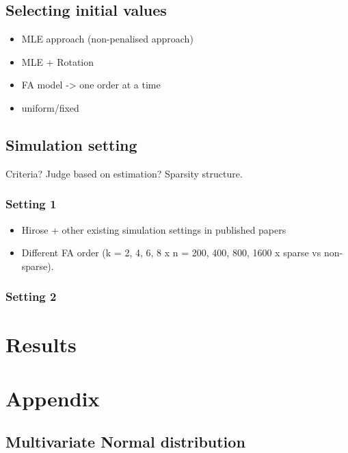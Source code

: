 \documentclass[
  a4paper,
  oneside,
  openany,
  12pt,
  onecolumn,
  twoside]{book}
\providecommand{\tightlist}{%
  \setlength{\itemsep}{0pt}\setlength{\parskip}{0pt}}\usepackage{longtable,booktabs,array}
\theoremstyle{plain}
\theoremstyle{remark}
\begin{document}
\section{Selecting initial values}\label{selecting-initial-values}

\begin{itemize}
\tightlist
\item
  MLE approach (non-penalised approach)
\item
  MLE + Rotation
\item
  FA model -\textgreater{} one order at a time
\item
  uniform/fixed
\end{itemize}

\section{Simulation setting}\label{simulation-setting}

Criteria? Judge based on estimation? Sparsity structure.

\subsection{Setting 1}\label{setting-1}

\begin{itemize}
\tightlist
\item
  Hirose + other existing simulation settings in published papers
\item
  Different FA order (k = 2, 4, 6, 8 x n = 200, 400, 800, 1600 x sparse
  vs non-sparse).
\end{itemize}

\subsection{Setting 2}\label{setting-2}


\chapter{Results}\label{sec-results}


\chapter{Appendix}\label{appendix}

\section{Multivariate Normal
distribution}\label{multivariate-normal-distribution}
\end{document}
